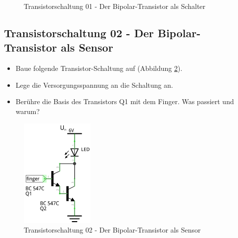 \begin{figure}[H]
	\centering
	\caption{Transistorschaltung 01 - Der Bipolar-Transistor als Schalter}
	\label{s01}
\end{figure}


\subsection[Der Bipolar-Transistor als Sensor]{Transistorschaltung 02 - Der Bipolar-Transistor als Sensor}

\begin{itemize}
\itemsep1pt\parskip0pt
\item Baue folgende Transistor-Schaltung auf (Abbildung \ref{s02}). 
\item Lege die Versorgungsspannung an die Schaltung an.
\item Berühre die Basis des Transistors Q1 mit dem Finger. Was passiert und warum?
\end{itemize}

\begin{figure}[H]
	\centering
	\includegraphics[scale=1.6]{Transistor/Schaltungen/NPN_Sensor.pdf}
	\caption{Transistorschaltung 02 - Der Bipolar-Transistor als Sensor}
	\label{s02}
\end{figure}

